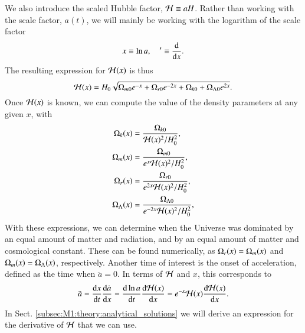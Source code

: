 We also introduce the scaled Hubble factor, $\mathcal{H}\equiv aH$. Rather than working with the scale factor, $a(t)$, we will mainly be working with the logarithm of the scale factor 
\begin{equation} \label{eq:M1:theory:x_dx_definitions}
    x\equiv \ln a,\quad '\equiv \dv{x}. 
\end{equation}
%
The resulting expression for $\mathcal{H}(x)$ is thus  
\begin{equation} \label{eq:M1:theory:Hp_of_x}
    \mathcal{H}(x) = H_0 \sqrt{\Omega_{m0} e^{-x} + \Omega_{r0} e^{-2x} + \Omega_{k0} + \Omega_{\Lambda 0} e^{2x}}. 
\end{equation}
%
Once $\mathcal{H}(x)$ is known, we can compute the value of the density parameters at any given $x$, with 
\begin{align}
    \Omega_{k}(x) &= \frac{\Omega_{k0}}{\mathcal{H}(x)^2 / H_0^2}, \label{eq:M1:theory:omega_k_of_x}\\ 
    \Omega_{m}(x) &= \frac{\Omega_{m0}}{e^x \mathcal{H}(x)^2 / H_0^2}, \label{eq:M1:theory:omega_m_of_x}\\ 
    \Omega_{r}(x) &= \frac{\Omega_{r0}}{e^{2x} \mathcal{H}(x)^2 / H_0^2}, \label{eq:M1:theory:omega_r_of_x}\\ 
    \Omega_{\Lambda}(x) &= \frac{\Omega_{\Lambda 0}}{e^{-2x} \mathcal{H}(x)^2 / H_0^2}, \label{eq:M1:theory:omega_L_of_x}    
\end{align}
With these expressions, we can determine when the Universe was dominated by an equal amount of matter and radiation, and by an equal amount of matter and cosmological constant. These can be found numerically, as $\Omega_{r}(x)=\Omega_{m}(x)$ and $\Omega_{m}(x)=\Omega_{\Lambda}(x)$, respectively. Another time of interest is the onset of acceleration, defined as the time when $\ddot{a}=0$. In terms of $\mathcal{H}$ and $x$, this corresponds to 
\begin{equation}
    \ddot{a} = \dv{x}{t}\dv{\dot{a}}{x}=\dv{\ln a}{t}\dv{\mathcal{H}(x)}{x} = e^{-x} \mathcal{H}(x) \dv{\mathcal{H}(x)}{x}. \label{eq:M1:theory:acceleration_onset}
\end{equation}   
In Sect. \ref{subsec:M1:theory:analytical_solutions} we will derive an expression for the derivative of $\mathcal{H}$ that we can use. 

